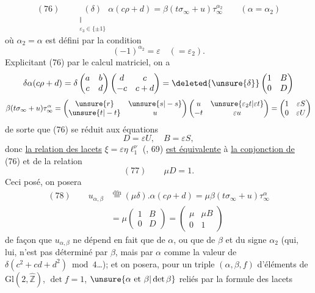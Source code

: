 \[
(76)\qquad
\underset{\substack{\Vert\\\varepsilon_3\in\{\pm1\}}}{(\delta)}
\alpha(c\rho+d)=\beta(t\sigma_\infty+u)\tau_\infty^{\alpha_2}
\qquad(\alpha=\alpha_2)
\]
où $\alpha_2=\alpha$ est défini par la condition
\[
(-1)^{\alpha_2}=\varepsilon\quad(=\varepsilon_2).
\]
Explicitant (76) par le calcul matriciel, on a
\[
\delta\alpha(c\rho+d)
=\delta\begin{pmatrix}a&b\\c&d\end{pmatrix}
\begin{pmatrix}d&c\\-c&c+d\end{pmatrix}
=\deleted{\unsure{\delta}}
\begin{pmatrix}1&B\\0&D\end{pmatrix}
\]
\[
\beta(t\sigma_\infty+u)\tau_\infty^\alpha
=\begin{pmatrix}\unsure{r}&\unsure{s|-s}\\\unsure{t|-t}&u\end{pmatrix}
\begin{pmatrix}u&\unsure{\varepsilon_2t|\varepsilon t}\\-t&\varepsilon u\end{pmatrix}
=\begin{pmatrix}1&\varepsilon S\\0&\varepsilon U\end{pmatrix}
\]
de sorte que (76) se réduit aux équations
\[
D=\varepsilon U,\quad B=\varepsilon S,
\]
donc \uline{la relation des lacets} $\xi=\varepsilon\eta \ell_1^\nu$ (, 69) \uline{est équivalente} à \uline{la conjonction de} (76) et de la relation
\[
(77)\qquad\mu D=1.
\]
Ceci posé, on posera 
\[
\begin{aligned}
(78)\qquad u_{\alpha,\beta}
&\overset{\mathrm{dfn}}{=}(\mu\delta).\alpha(c\rho+d)
=\mu\beta(t\sigma_\infty+u)\tau_\infty^\alpha\\
&=\mu\begin{pmatrix}1&B\\0&D\end{pmatrix}
=\begin{pmatrix}\mu&\mu B\\0&1\end{pmatrix}
\end{aligned}
\]
de façon que $u_{\alpha,\beta}$ ne dépend en fait que de $\alpha$, ou que de $\beta$ et du signe $\alpha_2$ (qui, lui, n'est pas déterminé par $\beta$, mais par $\alpha$ comme la valeur de $\delta(c^2+cd+d^2)\bmod4$\dots); et on posera, pour un triple $(\alpha,\beta,f)$ d'éléments de $\mathrm{Gl}(2,\widehat{\mathbb Z})$, $\det f=1$, $\unsure{\alpha\text{ et }\beta|\det\beta}$ reliés par la formule des lacets


